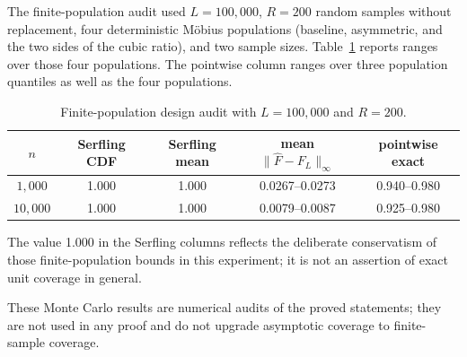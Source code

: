 \documentclass[11pt]{amsart}
\numberwithin{equation}{section}\setcounter{tocdepth}{3}\setcounter{secnumdepth}{3}
\begin{document}
The finite-population audit used $L=100{,}000$, $R=200$ random samples without
replacement, four deterministic Möbius populations (baseline, asymmetric, and the two
sides of the cubic ratio), and two sample sizes.  Table~\ref{tab:design_monte_carlo}
reports ranges over those four populations.  The pointwise column ranges over three
population quantiles as well as the four populations.
\begin{table}[htbp]
\centering\small
\caption{Finite-population design audit with $L=100{,}000$ and $R=200$.}
\label{tab:design_monte_carlo}
\begin{tabular}{ccccc}
\toprule
$n$ & Serfling CDF & Serfling mean & mean $\|\widehat F-F_L\|_\infty$ & pointwise exact \\
\midrule
$1{,}000$ & 1.000 & 1.000 & 0.0267--0.0273 & 0.940--0.980 \\
$10{,}000$ & 1.000 & 1.000 & 0.0079--0.0087 & 0.925--0.980 \\
\bottomrule
\end{tabular}
\end{table}
The value 1.000 in the Serfling columns reflects the deliberate conservatism of those
finite-population bounds in this experiment; it is not an assertion of exact unit
coverage in general.

These Monte Carlo results are numerical audits of the proved statements; they are not
used in any proof and do not upgrade asymptotic coverage to finite-sample coverage.
\end{document}
